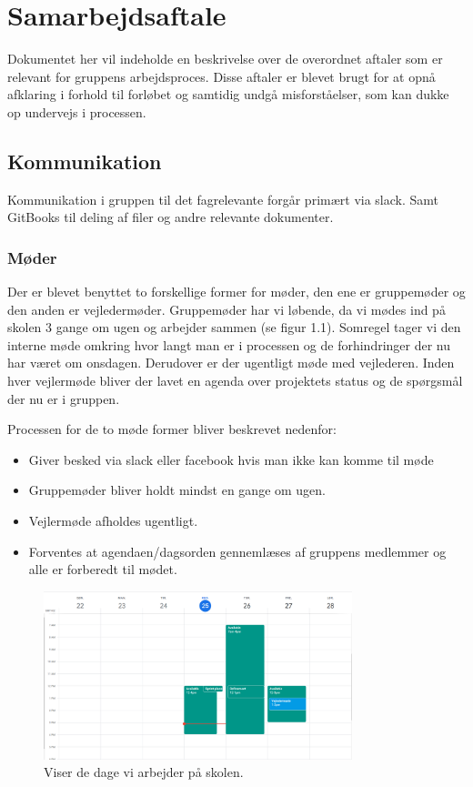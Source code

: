 \chapter{Samarbejdsaftale}
Dokumentet her vil indeholde en beskrivelse over de overordnet aftaler som er relevant for gruppens arbejdsproces. Disse aftaler er blevet brugt for at opnå afklaring i forhold til forløbet og samtidig undgå misforståelser, som kan dukke op undervejs i processen.

\section{Kommunikation}
Kommunikation i gruppen til det fagrelevante forgår primært via slack. Samt GitBooks til deling af filer og andre relevante dokumenter.

\subsection{Møder}
Der er blevet benyttet to forskellige former for møder, den ene er gruppemøder og den anden er vejledermøder. Gruppemøder har vi løbende, da vi mødes ind på skolen 3 gange om ugen og arbejder sammen (se figur 1.1). Somregel tager vi den interne møde omkring hvor langt man er i processen og de forhindringer der nu har været om onsdagen. Derudover er der ugentligt møde med vejlederen. Inden hver vejlermøde bliver der lavet en agenda over projektets status og de spørgsmål der nu er i gruppen. 

Processen for de to møde former bliver beskrevet nedenfor:

\begin{itemize}
    \item Giver besked via slack eller facebook hvis man ikke kan komme til møde
    \item Gruppemøder bliver holdt mindst en gange om ugen.
    \item Vejlermøde afholdes ugentligt.
    \item Forventes at agendaen/dagsorden gennemlæses af gruppens medlemmer og alle er forberedt til mødet.
\end{itemize}

\begin{figure}[ht]
    \centering
    \includegraphics[width=0.8\textwidth]{Billeder/groupmeeting.png}
    \caption{Viser de dage vi arbejder på skolen.}
    \label{fig:figure2}
\end{figure}

